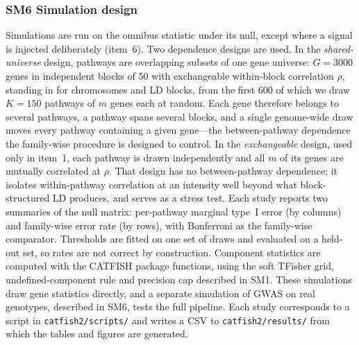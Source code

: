 \subsubsection*{SM6 Simulation design}

Simulations are run on the omnibus statistic under its null, except where a signal is injected deliberately (item~6). Two dependence designs are used. In the \emph{shared-universe} design, pathways are overlapping subsets of one gene universe: $G=3000$ genes in independent blocks of 50 with exchangeable within-block correlation $\rho$, standing in for chromosomes and LD blocks, from the first 600 of which we draw $K=150$ pathways of $m$ genes each at random. Each gene therefore belongs to several pathways, a pathway spans several blocks, and a single genome-wide draw moves every pathway containing a given gene---the between-pathway dependence the family-wise procedure is designed to control. In the \emph{exchangeable} design, used only in item~1, each pathway is drawn independently and all $m$ of its genes are mutually correlated at $\rho$. That design has no between-pathway dependence; it isolates within-pathway correlation at an intensity well beyond what block-structured LD produces, and serves as a stress test. Each study reports two summaries of the null matrix: per-pathway marginal type~I error (by columns) and family-wise error rate (by rows), with Bonferroni as the family-wise comparator. Thresholds are fitted on one set of draws and evaluated on a held-out set, so rates are not correct by construction. Component statistics are computed with the CATFISH package functions, using the soft TFisher grid, undefined-component rule and precision cap described in SM1. These simulations draw gene statistics directly, and a separate simulation of GWAS on real genotypes, described in SM6, tests the full pipeline. Each study corresponds to a script in \texttt{catfish2/scripts/} and writes a CSV to \texttt{catfish2/results/} from which the tables and figures are generated.

